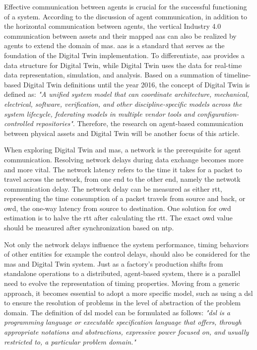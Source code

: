 Effective communication between agents is crucial for the successful functioning of a 
system\cite{georgeff_communication_1988}. According to the discussion of agent 
communication\cite{vogel-heuser_multi-agent_2020}, in addition to the horizontal 
communication between agents, the vertical Industry 4.0 communication between assets 
and their mapped \gls{aas} can also be realized by agents to extend the domain 
of \gls{mas}. \gls{aas} is a standard 
that serves as the foundation of the Digital Twin implementation\cite{Redeker2021}. 
To differentiate, \gls{aas} provides a data structure for Digital Twin, while Digital 
Twin uses the data for real-time data representation, simulation, and analysis. 
Based on a summation of timeline-based Digital Twin definitions until the year 
2016\cite{negri_review_2017}, the concept of Digital Twin is defined as: \textit{"A 
unified system model that can coordinate architecture, mechanical, electrical, 
software, verification, and other discipline-specific models across the system 
lifecycle, federating models in multiple vendor tools and configuration-controlled 
repositories"}\cite{bajaj_architecture_2016}. Therefore, the research on agent-based 
communication between physical assets and Digital Twin will be another focus of this 
article. 


When exploring Digital Twin and \gls{mas}, a network is the prerequisite for agent communication. 
Resolving network delays during data exchange becomes more and more vital. The network 
latency refers to the time it takes for a packet to travel across the network, from one end 
to the other end, namely the netwotk communication delay. The network delay can be measured 
as either \gls{rtt}, representing the time consumption of a packet travels from source and 
back, or \gls{owd}, the one-way latency from source to 
destination. One solution for \gls{owd} estimation is to halve the 
\gls{rtt}\cite{abdou_accurate_2015} after calculating the \gls{rtt}\cite{karn_improving_nodate}. 
The exact \gls{owd} value should be measured after synchronization based on \gls{ntp}\cite{abdou_accurate_2015}. 


Not only the network delays influence the system performance, timing behaviors of other 
entities for example the control delays, should also be considered for the \gls{mas} and 
Digital Twin system.
Just as a factory's production shifts from standalone operations to a distributed, 
agent-based system, there is a parallel need to evolve the representation of timing 
properties. Moving from a generic approach, it becomes essential to adopt a more 
specific model, such as using a \gls{dsl} to ensure the resolution of problems 
in the level of abstraction of the problem domain. The definition of \gls{dsl} model 
can be formulated as follows: \textit{"\gls{dsl} is a programming language or executable 
specification language
that offers, through appropriate notations and abstractions, expressive power focused 
on, and usually restricted to, a particular problem domain."}\cite{van_deursen_domain-specific_2000}

